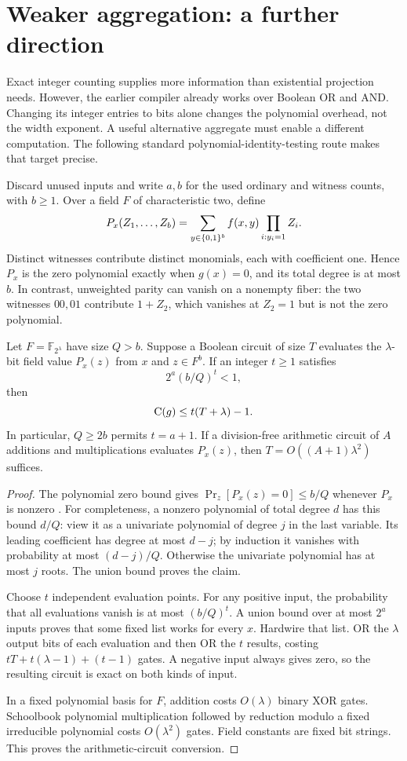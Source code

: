 \section{Weaker aggregation: a further direction}
\label{sec:aggregation}

Exact integer counting supplies more information than existential
projection needs. However, the earlier compiler already works over
Boolean OR and AND. Changing its integer entries to bits alone changes
the polynomial overhead, not the width exponent. A useful alternative
aggregate must enable a different computation. The following standard
polynomial-identity-testing route makes that target precise.

Discard unused inputs and write $a,b$ for the used ordinary and witness
counts, with $b\ge1$. Over a field $F$ of characteristic two, define
\[
 P_x(Z_1,\ldots,Z_b)
   =\sum_{y\in\{0,1\}^b} f(x,y)\prod_{i:y_i=1}Z_i.
\]
Distinct witnesses contribute distinct monomials, each with coefficient
one. Hence $P_x$ is the zero polynomial exactly when $g(x)=0$, and
its total degree is at most $b$. In contrast, unweighted parity can
vanish on a nonempty fiber: the two witnesses $00,01$ contribute
$1+Z_2$, which vanishes at $Z_2=1$ but is not the zero polynomial.

\begin{proposition}
\label{prop:fingerprint}
Let $F=\mathbb F_{2^\lambda}$ have size $Q>b$. Suppose a Boolean
circuit of size $T$ evaluates the $\lambda$-bit field value $P_x(z)$
from $x$ and $z\in F^b$. If an integer $t\ge1$ satisfies
\[
 2^a(b/Q)^t<1,
\]
then
\[
 \mathrm{C}(g)\le t(T+\lambda)-1.
\]
In particular, $Q\ge2b$ permits $t=a+1$. If a division-free
arithmetic circuit of $A$ additions and multiplications evaluates
$P_x(z)$, then $T=O((A+1)\lambda^2)$ suffices.
\end{proposition}
\begin{proof}
The polynomial zero bound gives
$\Pr_z[P_x(z)=0]\le b/Q$ whenever $P_x$ is nonzero
\citep{Schwartz1980}. For completeness, a nonzero polynomial of
total degree $d$ has this bound $d/Q$: view it as a univariate
polynomial of degree $j$ in the last variable. Its leading coefficient
has degree at most $d-j$; by induction it vanishes with probability
at most $(d-j)/Q$. Otherwise the univariate polynomial has at most
$j$ roots. The union bound proves the claim.

Choose $t$ independent evaluation points. For any positive input, the
probability that all evaluations vanish is at most $(b/Q)^t$.
A union bound over at most $2^a$ inputs proves that some fixed list
works for every $x$. Hardwire that list. OR the $\lambda$ output
bits of each evaluation and then OR the $t$ results, costing
$tT+t(\lambda-1)+(t-1)$ gates. A negative input always gives zero,
so the resulting circuit is exact on both kinds of input.

In a fixed polynomial basis for $F$, addition costs $O(\lambda)$
binary XOR gates. Schoolbook polynomial multiplication followed by
reduction modulo a fixed irreducible polynomial costs
$O(\lambda^2)$ gates. Field constants are fixed bit strings.
This proves the arithmetic-circuit conversion.
\end{proof}

